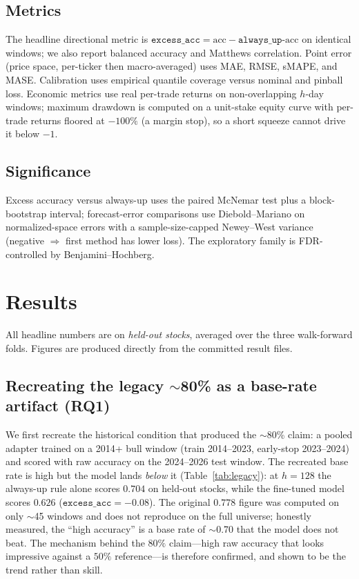 \documentclass[11pt]{article}
\newcommand{\excess}{\texttt{excess\_acc}}
\newcommand{\alwaysup}{\texttt{always\_up}}
\begin{document}
\subsection{Metrics}
The headline directional metric is $\excess = \text{acc} - \alwaysup\text{-acc}$ on
identical windows; we also report balanced accuracy and Matthews correlation. Point
error (price space, per-ticker then macro-averaged) uses MAE, RMSE, sMAPE, and MASE.
Calibration uses empirical quantile coverage versus nominal and pinball loss. Economic
metrics use real per-trade returns on non-overlapping $h$-day windows; maximum drawdown
is computed on a unit-stake equity curve with per-trade returns floored at $-100\%$ (a
margin stop), so a short squeeze cannot drive it below $-1$.

\subsection{Significance}
Excess accuracy versus always-up uses the paired McNemar test plus a block-bootstrap
interval; forecast-error comparisons use Diebold--Mariano on normalized-space errors
with a sample-size-capped Newey--West variance (negative $\Rightarrow$ first method has
lower loss). The exploratory family is FDR-controlled by Benjamini--Hochberg.

\section{Results}

All headline numbers are on \emph{held-out stocks}, averaged over the three
walk-forward folds. Figures are produced directly from the committed result files.

\subsection{Recreating the legacy $\sim$80\% as a base-rate artifact (RQ1)}
We first recreate the historical condition that produced the $\sim$80\% claim: a pooled
adapter trained on a 2014+ bull window (train 2014--2023, early-stop 2023--2024) and
scored with raw accuracy on the 2024--2026 test window. The recreated base rate is
high but the model lands \emph{below} it (Table~\ref{tab:legacy}): at $h=128$ the
always-up rule alone scores $0.704$ on held-out stocks, while the fine-tuned model
scores $0.626$ ($\excess = -0.08$). The original $0.778$ figure was computed on only
$\sim$45 windows and does not reproduce on the full universe; honestly measured, the
``high accuracy'' is a base rate of $\sim$0.70 that the model does not beat. The
mechanism behind the $80\%$ claim---high raw accuracy that looks impressive against a
$50\%$ reference---is therefore confirmed, and shown to be the trend rather than skill.
\end{document}
